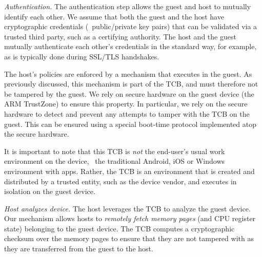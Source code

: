 \begin{mylist}
%
\item \textit{Authentication.} The authentication step allows the guest and
host to mutually identify each other. We assume that both the guest and the
host have cryptographic credentials (\eg~public/private key pairs) that can be
validated via a trusted third party, such as a certifying authority. The host
and the guest mutually authenticate each other's credentials in the standard
way, for example, as is typically done during SSL/TLS handshakes.

The host's policies are enforced by a mechanism that executes in the guest.  As
previously discussed, this mechanism is part of the TCB, and must therefore not
be tampered by the guest.  We rely on secure hardware on the guest device (the
ARM TrustZone) to ensure this property.  In particular, we rely on the secure
hardware to detect and prevent any attempts to tamper with the TCB on the
guest. This can be ensured using a special boot-time protocol implemented atop
the secure hardware.

It is important to note that this TCB is \textit{not} the end-user's usual work
environment on the device, \eg~the traditional Android, iOS or Windows
environment with apps. Rather, the TCB is an environment that is created and
distributed by a trusted entity, such as the device vendor, and executes in
isolation on the guest device. 

%
%

\item \textit{Host analyzes device.} The host leverages the TCB to analyze the
guest device. Our mechanism allows hosts to \textit{remotely fetch memory
pages} (and CPU register state) belonging to the guest device.  The TCB
computes a cryptographic checksum over the memory pages to ensure that they are
not tampered with as they are transferred from the guest to the host. 


\end{mylist}
